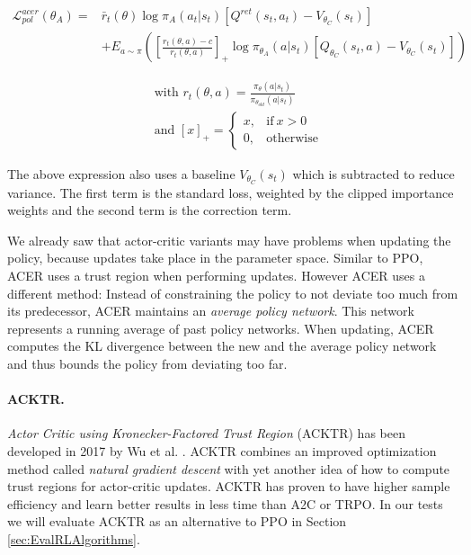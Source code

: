 \begin{align*}
  \mathcal{L}^{acer}_{pol}(\theta_A) = &\bar{r}_t(\theta) \log \pi_A(a_t|s_t)[Q^{ret}(s_t, a_t) - V_{\theta_C}(s_t)] \\ 
  &+ E_{a\sim\pi} \left(\left[\frac{r_t(\theta, a) - c}{r_t(\theta, a)}\right]_{+} \log \pi_{\theta_A}(a|s_t)[Q_{\theta_C}(s_t, a) - V_{\theta_C}(s_t)] \right)
\end{align*}

\begin{align*}
  &\text{with } r_t(\theta, a) = \frac{\pi_\theta(a|s_t)}{\pi_{\theta_{old}}(a|s_t)} \\
  &\text{and } [x]_+ = 
  \begin{cases} 
    x, & \text{if}\ x > 0 \\
    0, & \text{otherwise}
  \end{cases}  
\end{align*}
 

The above expression also uses a baseline $V_{\theta_C}(s_t)$ which is subtracted to reduce variance. The first term is the standard loss, weighted by the clipped importance weights and the second term is the correction term.

We already saw that actor-critic variants may have problems when updating the policy, because updates take place in the parameter space. Similar to PPO, ACER uses a trust region when performing updates. However ACER uses a different method: Instead of constraining the policy to not deviate too much from its predecessor, ACER maintains an \textit{average policy network}. This network represents a running average of past policy networks. When updating, ACER computes the KL divergence between the new and the average policy network and thus bounds the policy from deviating too far.

\paragraph{ACKTR.} \textit{Actor Critic using Kronecker-Factored Trust Region} (ACKTR) has been developed in 2017 by Wu et al. \cite{wu2017scalable}. ACKTR combines an improved optimization method called \textit{natural gradient descent} with yet another idea of how to compute trust regions for actor-critic updates. ACKTR has proven to have higher sample efficiency and learn better results in less time than A2C or TRPO. In our tests we will evaluate ACKTR as an alternative to PPO in Section \ref{sec:EvalRLAlgorithms}.

